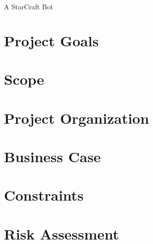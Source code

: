 \documentclass[11pt]{article}
\begin{document}
\begin{center}
{{\Large \sc A StarCraft Bot}}
\end{center}
\section*{Project Goals}


\section*{Scope}


\section*{Project Organization}


\section*{Business Case}


\section*{Constraints}


\section*{Risk Assessment}
\end{document}
